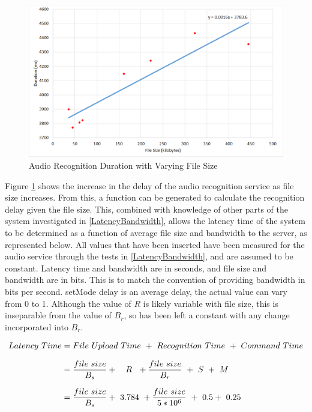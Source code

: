 \documentclass{article}
\begin{document}
\begin{figure}[h]
\caption{Audio Recognition Duration with Varying File Size\label{fig:RecognitionDuration}}
\includegraphics[width=\textwidth]{RecognitionDuration}
\end{figure}

Figure \ref{fig:RecognitionDuration} shows the increase in the delay of the audio recognition service as file size increases. From this, a function can be generated to calculate the recognition delay given the file size. This, combined with knowledge of other parts of the system investigated in \ref{LatencyBandwidth}, allows the latency time of the system to be determined as a function of average file size and bandwidth to the server, as represented below. All values that have been inserted have been measured for the audio service through the tests in \ref{LatencyBandwidth}, and are assumed to be constant. Latency time and bandwidth are in seconds, and file size and bandwidth are in bits. This is to match the convention of providing bandwidth in bits per second. setMode delay is an average delay, the actual value can vary from 0 to 1. Although the value of $R$ is likely variable with file size, this is inseparable from the value of $B_r$, so has been left a constant with any change incorporated into $B_r$.

\begin{equation*}
\setlength{\jot}{10pt}
\begin{split}
Latency\ Time 	&= File\ Upload\ Time\ +\ Recognition\ Time\ +\ Command\ Time \\
				&= \frac{file\ size}{B_s} +\ \ \ R\ \ + \frac{file\ size}{B_r}\ +\ S\  +\ M \\
				&= \frac{file\ size}{B_s} +\ 3.784\ + \frac{file\ size}{5*10^6}\ +\ 0.5 +\ 0.25 
\end{split}
\end{equation*}
\end{document}
